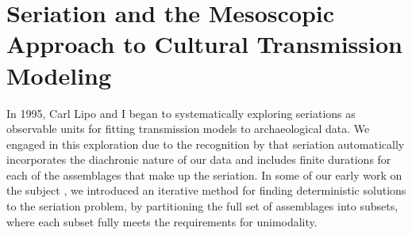 \section{Seriation and the Mesoscopic Approach to Cultural Transmission Modeling}

In 1995, Carl Lipo and I \citep{huntmadsenlipo1995a,lipomadsenhunt1995b,Lipo1997,Lipo2000,lipomadsen1997,Lipo2001a,Lipo2001} began to systematically exploring seriations as observable units for fitting transmission models to archaeological data.  We engaged in this exploration due to the recognition by \citet{Dunnell1970} that seriation automatically incorporates the diachronic nature of our data and includes finite durations for each of the assemblages that make up the seriation. In some of our early work on the subject , we introduced an iterative method for finding deterministic solutions to the seriation problem, by partitioning the full set of assemblages into subsets, where each subset fully meets the requirements for unimodality.  

